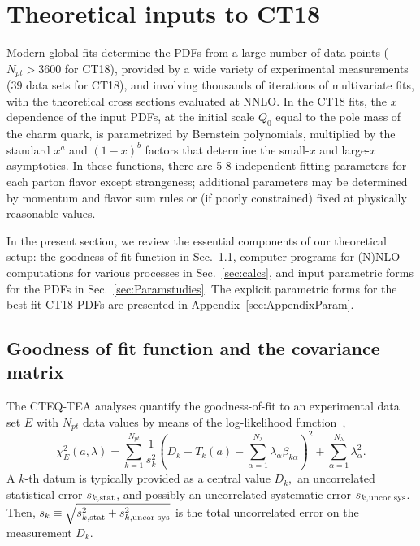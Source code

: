 \section{Theoretical inputs to CT18
\label{sec:Theory}}

Modern global fits  determine the PDFs from 
a large number of data points ($N_\mathit{pt}\! >\! 3600$ for CT18), provided by a wide variety of experimental measurements
(39 data sets for CT18), and involving thousands of
iterations of multivariate fits, with the theoretical cross sections evaluated at NNLO.
In the CT18 fits, the $x$ dependence of the input PDFs, at the initial scale $Q_0$ equal to the pole mass of the charm quark, is parametrized by
Bernstein polynomials, multiplied by the standard $x^a$ and $(1-x)^b$ factors that determine the small-$x$ and large-$x$ asymptotics.  In these functions, there are 5-8 independent
fitting parameters for each parton flavor except strangeness; additional parameters may be determined by momentum and 
flavor sum rules or (if poorly constrained) fixed at physically reasonable values.

In the present section, we review the essential components of our theoretical setup: the goodness-of-fit function in  Sec.~\ref{sec:chi2}, 
computer programs for (N)NLO computations for various processes  in Sec.~\ref{sec:calcs}, and 
input parametric forms for the PDFs in Sec.~\ref{sec:Paramstudies}. The explicit parametric forms for the best-fit CT18 PDFs are presented in 
Appendix~\ref{sec:AppendixParam}. 

\subsection{Goodness of fit function and the covariance matrix}
\label{sec:chi2}
%
%
The CTEQ-TEA analyses quantify the goodness-of-fit to an experimental data set
$E$ with $N_{pt}$
data values by means of the log-likelihood function~\cite{Pumplin:2002vw},
%
\begin{equation}
\chi_{E}^{2}(a,\lambda)=\sum_{k=1}^{N_{pt}}\frac{1}{s_{k}^{2}}\left(D_{k}-T_{k}(a)-\sum_{\alpha=1}^{N_{\lambda}}\lambda_{\alpha}\beta_{k\alpha}\right)^{2}+\sum_{\alpha=1}^{N_{\lambda}}\lambda_{\alpha}^{2}.\label{Chi2sys}
\end{equation}
%
A $k$-th datum is typically provided as a central value $D_{k},$ an uncorrelated
statistical error $s_{k,\mbox{\scriptsize stat}}$, and possibly an
uncorrelated systematic error
$s_{k,\mbox{\scriptsize uncor sys}}$.
Then, $s_{k}\equiv \sqrt{s_{k,\mbox{\scriptsize stat}}^{2}+s_{k,\mbox{\scriptsize uncor sys}}^{2}}$
is the total uncorrelated error on the measurement $D_{k}$.

